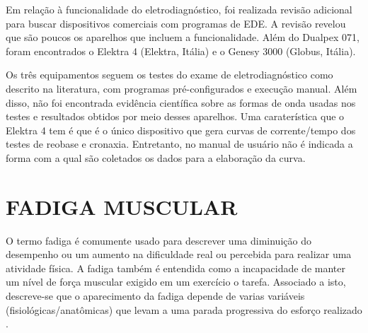 Em relação à funcionalidade do eletrodiagnóstico, foi realizada revisão adicional para buscar dispositivos comerciais com programas de \acrshort{EDE}. A revisão revelou que são poucos os aparelhos que incluem a funcionalidade. Além do Dualpex 071, foram encontrados o Elektra 4 (Elektra, Itália) e o Genesy 3000 (Globus, Itália).

Os três equipamentos seguem os testes do exame de eletrodiagnóstico como descrito na literatura, com programas pré-configurados e execução manual. Além disso, não foi encontrada evidência científica sobre as formas de onda usadas nos testes e resultados obtidos por meio desses aparelhos.
Uma caraterística que o Elektra 4 tem é que é o único dispositivo que gera curvas de corrente/tempo dos testes de reobase e cronaxia. Entretanto, no manual de usuário não é indicada a forma com a qual são coletados os dados para a elaboração da curva.



\section{FADIGA MUSCULAR}




O termo fadiga é comumente usado para descrever uma diminuição do desempenho ou um aumento na dificuldade real ou percebida para realizar uma atividade física. A fadiga também é entendida como a incapacidade de manter um nível de força muscular exigido em um exercício o tarefa. Associado a isto, descreve-se que o aparecimento da fadiga depende de varias variáveis (fisiológicas/anatômicas) que levam a uma parada progressiva do esforço realizado \cite{ArceRodriguez2015PhysiologicalFatigue}.

